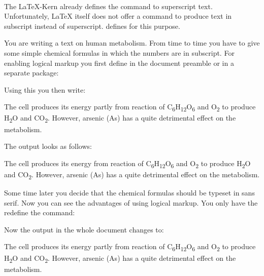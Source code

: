 \ifCommonscrlayerscrpage\else
\begin{Declaration}
  \\
\end{Declaration}
%
%
The \LaTeX-Kern already defines the command
 to
superscript text. Unfortunately,
{\LaTeX} itself does not offer a command to produce text in
subscript instead of
superscript. {\KOMAScript}
defines  for this purpose. %
%
\ifCommonmaincls
\begin{Example}
  \label{desc:maincls.textsubscript.example}%
  You are writing a text on human metabolism. From time to time you
  have to give some simple chemical formulas in which the numbers are
  in subscript. For enabling logical markup you first define in the
  document preamble or in a separate package:
\begin{lstcode}
  \newcommand*{\molec}[2]{#1\textsubscript{#2}}
\end{lstcode}
  \newcommand*{\molec}[2]{#1\textsubscript{#2}}
  Using this you then write:
\begin{lstcode}
  The cell produces its energy partly from reaction of \molec C6\molec
  H{12}\molec O6 and \molec O2 to produce \molec H2\Molec O{} and
  \molec C{}\molec O2.  However, arsenic (\molec{As}{}) has a quite
  detrimental effect on the metabolism.
\end{lstcode}
  The output looks as follows:
  \begin{ShowOutput}
    The cell produces its energy from reaction of \molec C6\molec
    H{12}\molec O6 and \molec O2 to produce \molec H2\molec O{} and
    \molec C{}\molec O2.  However, arsenic (\molec{As}{}) has a quite
    detrimental effect on the metabolism.
  \end{ShowOutput}
  Some time later you decide that the chemical formulas should be
  typeset in sans serif. Now you can see the advantages of using
  logical markup. You only have the redefine the 
  command:
\begin{lstcode}
  \newcommand*{\molec}[2]{\textsf{#1\textsubscript{#2}}}
\end{lstcode}
  \renewcommand*{\molec}[2]{\textsf{#1\textsubscript{#2}}}
  Now the output in the whole document changes to:
  \begin{ShowOutput}
    The cell produces its energy partly from reaction of \molec
    C6\molec H{12}\molec O6 and \molec O2 to produce \molec H2\molec
    O{} and \molec C{}\molec O2.  However, arsenic (\molec{As}{}) has
    a quite detrimental effect on the metabolism.
  \end{ShowOutput}
\end{Example}
